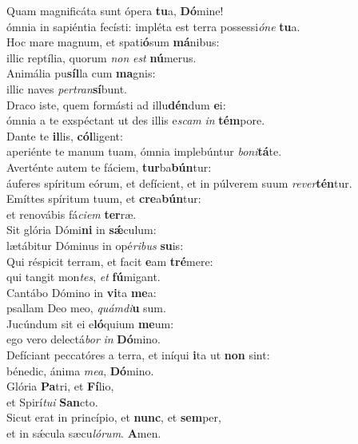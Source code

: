 \oddverse Quam magnificáta sunt ópera \textbf{tu}a, \textbf{Dó}mine!~\*\\
\oddverse ómnia in sapiéntia fecísti: impléta est terra possessi\textit{ó}\textit{ne} \textbf{tu}a.\\
\evenverse Hoc mare magnum, et spati\textbf{ó}sum \textbf{má}nibus:~\*\\
\evenverse illic reptília, quorum \textit{non} \textit{est} \textbf{nú}merus.\\
\oddverse Animália pu\textbf{síl}la cum \textbf{ma}gnis:~\*\\
\oddverse illic naves \textit{per}\textit{tran}\textbf{sí}bunt.\\
\evenverse Draco iste, quem formásti ad illu\textbf{dén}dum \textbf{e}i:~\*\\
\evenverse ómnia a te exspéctant ut des illis e\textit{scam} \textit{in} \textbf{tém}pore.\\
\oddverse Dante te \textbf{il}lis, \textbf{cól}ligent:~\*\\
\oddverse aperiénte te manum tuam, ómnia implebúntur \textit{bo}\textit{ni}\textbf{tá}te.\\
\evenverse Averténte autem te fáciem, \textbf{tur}ba\textbf{bún}tur:~\*\\
\evenverse áuferes spíritum eórum, et defícient, et in púlverem suum \textit{re}\textit{ver}\textbf{tén}tur.\\
\oddverse Emíttes spíritum tuum, et \textbf{cre}a\textbf{bún}tur:~\*\\
\oddverse et renovábis fá\textit{ci}\textit{em} \textbf{ter}ræ.\\
\evenverse Sit glória Dómi\textbf{ni} in \textbf{sǽ}culum:~\*\\
\evenverse lætábitur Dóminus in opé\textit{ri}\textit{bus} \textbf{su}is:\\
\oddverse Qui réspicit terram, et facit \textbf{e}am \textbf{tré}mere:~\*\\
\oddverse qui tangit mon\textit{tes}, \textit{et} \textbf{fú}migant.\\
\evenverse Cantábo Dómino in \textbf{vi}ta \textbf{me}a:~\*\\
\evenverse psallam Deo meo, \textit{quám}\textit{di}\textbf{u} sum.\\
\oddverse Jucúndum sit ei e\textbf{ló}quium \textbf{me}um:~\*\\
\oddverse ego vero delectá\textit{bor} \textit{in} \textbf{Dó}mino.\\
\evenverse Defíciant peccatóres a terra, et iníqui \textbf{i}ta ut \textbf{non} sint:~\*\\
\evenverse bénedic, ánima \textit{me}\textit{a}, \textbf{Dó}mino.\\
\oddverse Glória \textbf{Pa}tri, et \textbf{Fí}lio,~\*\\
\oddverse et Spirí\textit{tu}\textit{i} \textbf{San}cto.\\
\evenverse Sicut erat in princípio, et \textbf{nunc}, et \textbf{sem}per,~\*\\
\evenverse et in sǽcula sæcu\textit{ló}\textit{rum}. \textbf{A}men.\\
